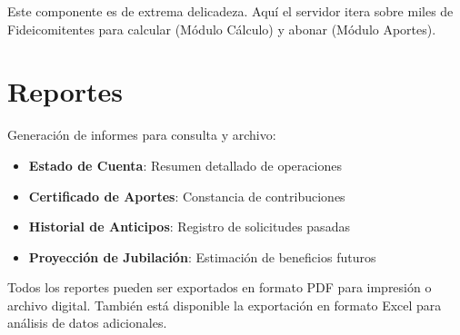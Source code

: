 Este componente es de extrema delicadeza. Aquí el servidor itera sobre miles de Fideicomitentes para calcular (Módulo Cálculo) y abonar (Módulo Aportes).

\section{Reportes}

Generación de informes para consulta y archivo:

\begin{itemize}[leftmargin=*]
    \item \textbf{Estado de Cuenta}: Resumen detallado de operaciones
    \item \textbf{Certificado de Aportes}: Constancia de contribuciones
    \item \textbf{Historial de Anticipos}: Registro de solicitudes pasadas
    \item \textbf{Proyección de Jubilación}: Estimación de beneficios futuros
\end{itemize}

\begin{tcolorbox}[
    enhanced,
    colback=sandraSoft,
    colframe=sandraAccent,
    width=0.9\textwidth,
    halign=center
]
\small
Todos los reportes pueden ser exportados en formato PDF para impresión o archivo digital. También está disponible la exportación en formato Excel para análisis de datos adicionales.
\end{tcolorbox}

\newpage
